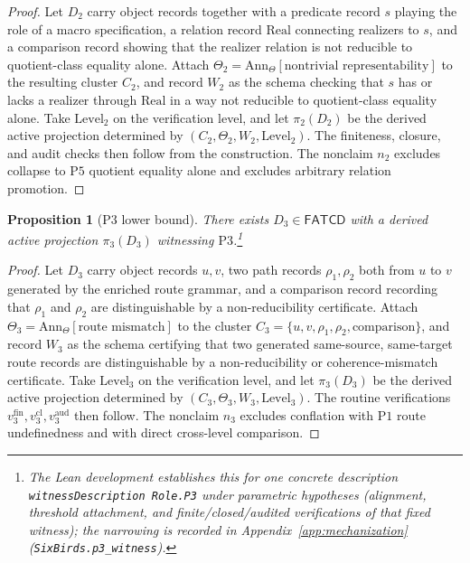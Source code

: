 \documentclass[11pt]{article}
\newtheorem{proposition}[theorem]{Proposition}
\theoremstyle{definition}
\newcommand{\FATCD}{\ensuremath{\mathsf{FATCD}}}
\newcommand{\Pone}{\ensuremath{\mathrm{P1}}}
\newcommand{\Pthree}{\ensuremath{\mathrm{P3}}}
\newcommand{\Pfive}{\ensuremath{\mathrm{P5}}}
\begin{document}
\begin{proof}
Let \(D_2\) carry object records together with a predicate record \(s\)
playing the role of a macro specification, a relation record
\(\mathrm{Real}\) connecting realizers to \(s\), and a comparison
record showing that the realizer relation is not reducible to
quotient-class equality alone. Attach
\(\Theta_2 = \mathrm{Ann}_\Theta[\text{nontrivial representability}]\)
to the resulting cluster \(C_2\), and record \(W_2\) as the schema
checking that \(s\) has or lacks a realizer through \(\mathrm{Real}\) in
a way not reducible to quotient-class equality alone. Take
\(\mathrm{Level}_2\) on the verification level, and let \(\pi_2(D_2)\)
be the derived active projection determined by
\((C_2,\Theta_2,W_2,\mathrm{Level}_2)\). The finiteness, closure, and
audit checks then follow from the construction. The
nonclaim \(n_2\) excludes collapse to \Pfive{} quotient equality alone
and excludes arbitrary relation promotion.
\end{proof}

\begin{proposition}[\Pthree{} lower bound]\label{prop:p3-witness}
There exists \(D_3 \in \FATCD{}\) with a derived active projection
\(\pi_3(D_3)\) witnessing \Pthree{}.\footnote{The Lean development establishes this for one concrete description \texttt{witnessDescription Role.P3} under parametric hypotheses (alignment, threshold attachment, and finite/closed/audited verifications of that fixed witness); the narrowing is recorded in Appendix~\ref{app:mechanization} (\texttt{SixBirds.p3\_witness}).}
\end{proposition}

\begin{proof}
Let \(D_3\) carry object records \(u, v\), two path records
\(\rho_1, \rho_2\) both from \(u\) to \(v\) generated by the enriched
route grammar, and a comparison record recording that \(\rho_1\) and
\(\rho_2\) are distinguishable by a non-reducibility certificate.
Attach \(\Theta_3 = \mathrm{Ann}_\Theta[\text{route mismatch}]\) to the
cluster \(C_3 = \{u, v, \rho_1, \rho_2, \text{comparison}\}\), and
record \(W_3\) as the schema certifying that two generated same-source,
same-target route records are distinguishable by a non-reducibility or
coherence-mismatch certificate. Take \(\mathrm{Level}_3\) on the
verification level, and let \(\pi_3(D_3)\) be the derived active
projection determined by
\((C_3,\Theta_3,W_3,\mathrm{Level}_3)\). The routine verifications
\(v_3^{\mathrm{fin}}, v_3^{\mathrm{cl}}, v_3^{\mathrm{aud}}\) then
follow. The nonclaim \(n_3\) excludes conflation with
\Pone{} route undefinedness and with direct cross-level comparison.
\end{proof}
\end{document}
